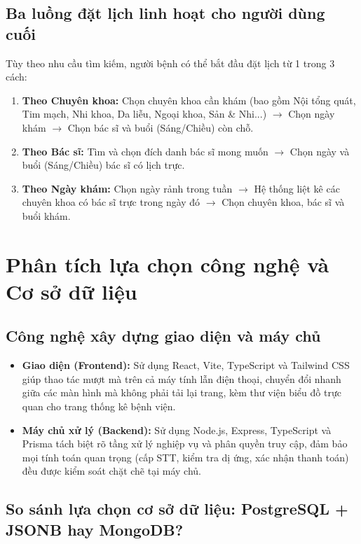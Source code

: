 \documentclass[12pt,a4paper]{report}
\begin{document}
\subsection{Ba luồng đặt lịch linh hoạt cho người dùng cuối}
Tùy theo nhu cầu tìm kiếm, người bệnh có thể bắt đầu đặt lịch từ 1 trong 3 cách:
\begin{enumerate}
  \item \textbf{Theo Chuyên khoa:} Chọn chuyên khoa cần khám (bao gồm Nội tổng quát, Tim mạch, Nhi khoa, Da liễu, Ngoại khoa, Sản \& Nhi...) $\rightarrow$ Chọn ngày khám $\rightarrow$ Chọn bác sĩ và buổi (Sáng/Chiều) còn chỗ.
  \item \textbf{Theo Bác sĩ:} Tìm và chọn đích danh bác sĩ mong muốn $\rightarrow$ Chọn ngày và buổi (Sáng/Chiều) bác sĩ có lịch trực.
  \item \textbf{Theo Ngày khám:} Chọn ngày rảnh trong tuần $\rightarrow$ Hệ thống liệt kê các chuyên khoa có bác sĩ trực trong ngày đó $\rightarrow$ Chọn chuyên khoa, bác sĩ và buổi khám.
\end{enumerate}

\section{Phân tích lựa chọn công nghệ và Cơ sở dữ liệu}

\subsection{Công nghệ xây dựng giao diện và máy chủ}
\begin{itemize}
  \item \textbf{Giao diện (Frontend):} Sử dụng React, Vite, TypeScript và Tailwind CSS giúp thao tác mượt mà trên cả máy tính lẫn điện thoại, chuyển đổi nhanh giữa các màn hình mà không phải tải lại trang, kèm thư viện biểu đồ trực quan cho trang thống kê bệnh viện.
  \item \textbf{Máy chủ xử lý (Backend):} Sử dụng Node.js, Express, TypeScript và Prisma tách biệt rõ tầng xử lý nghiệp vụ và phân quyền truy cập, đảm bảo mọi tính toán quan trọng (cấp STT, kiểm tra dị ứng, xác nhận thanh toán) đều được kiểm soát chặt chẽ tại máy chủ.
\end{itemize}

\subsection{So sánh lựa chọn cơ sở dữ liệu: PostgreSQL + JSONB hay MongoDB?}
\end{document}
